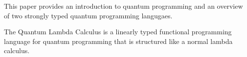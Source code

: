 This paper provides an introduction to quantum programming and an overview of two strongly typed quantum programming langugaes.

The Quantum Lambda Calculus is a linearly typed functional programming language for quantum programming that is structured like a normal lambda calculus.
